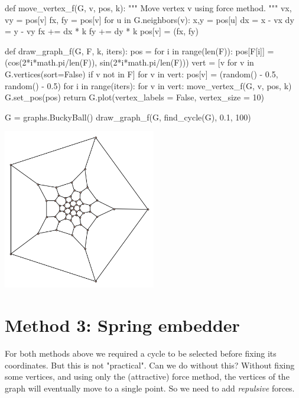 \medskip
\begin{sageCell}
def move_vertex_f(G, v, pos, k):
    """
    Move vertex v using force method.
    """
    vx, vy = pos[v]
    fx, fy = pos[v]
    for u in G.neighbors(v):
        x,y = pos[u]
        dx = x - vx
        dy = y - vy
        fx += dx * k
        fy += dy * k
    pos[v] = (fx, fy)


def draw_graph_f(G, F, k, iters):
    pos = {}
    for i in range(len(F)):
        pos[F[i]] = (cos(2*i*math.pi/len(F)), sin(2*i*math.pi/len(F)))
    vert = [v for v in G.vertices(sort=False) if v not in F]
    for v in vert:
        pos[v] = (random() - 0.5, random() - 0.5)
    for i in range(iters):
        for v in vert:
            move_vertex_f(G, v, pos, k)
    G.set_pos(pos)
    return G.plot(vertex_labels = False, vertex_size = 10)
\end{sageCell}
\begin{sageCell}
    G = graphs.BuckyBall()
    draw_graph_f(G, find_cycle(G), 0.1, 100)
\end{sageCell}
\begin{outImage}
    \includegraphics[width=0.5\textwidth]{Images/Drawing/bucky_ball_force_100.png}
\end{outImage}

\section{Method 3: Spring embedder}

For both methods above we required a cycle to be selected before fixing its coordinates. But this is not "practical". Can we do without this?
Without fixing some vertices, and using only the (attractive) force method, the vertices of the graph will eventually move to a single point. So we need to add \emph{repulsive} forces.

